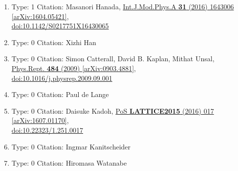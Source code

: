 \documentclass[a4paper,10pt]{article}
\begin{document}
\begin{enumerate}
\begin{enumerate}
  \item Type: 1 Citation: Masanori Hanada, \href{https://www.doi.org/10.1142/S0217751X16430065}{Int.J.Mod.Phys.A {\bf 31} (2016) 1643006}  \href{https://arxiv.org/abs/1604.05421}{[arXiv:1604.05421]},\\\href{https://www.doi.org/10.1142/S0217751X16430065}{doi:10.1142/S0217751X16430065}
  \item Type: 0 Citation: Xizhi Han
  \item Type: 0 Citation: Simon Catterall, David B. Kaplan, Mithat Unsal, \href{https://www.doi.org/10.1016/j.physrep.2009.09.001}{Phys.Rept. {\bf 484} (2009) }  \href{https://arxiv.org/abs/0903.4881}{[arXiv:0903.4881]},\\\href{https://www.doi.org/10.1016/j.physrep.2009.09.001}{doi:10.1016/j.physrep.2009.09.001}
  \item Type: 0 Citation: Paul de Lange
  \item Type: 0 Citation: Daisuke Kadoh, \href{https://www.doi.org/10.22323/1.251.0017}{PoS {\bf LATTICE2015} (2016) 017}  \href{https://arxiv.org/abs/1607.01170}{[arXiv:1607.01170]},\\\href{https://www.doi.org/10.22323/1.251.0017}{doi:10.22323/1.251.0017}
  \item Type: 0 Citation: Ingmar Kanitscheider
  \item Type: 0 Citation: Hiromasa Watanabe

\end{enumerate}
\end{enumerate}
\end{document}
